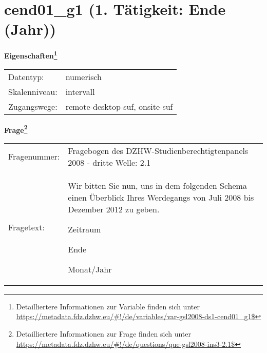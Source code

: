 
    \setcounter{footnote}{0}

    \vspace*{-1.8cm}
	\section{cend01\_g1 (1. Tätigkeit: Ende (Jahr))}
	\label{section:cend01_g1}



    \vspace*{0.5cm}
    \noindent\textbf{Eigenschaften\footnote{Detailliertere Informationen zur Variable finden sich unter
		\url{https://metadata.fdz.dzhw.eu/\#!/de/variables/var-gsl2008-ds1-cend01_g1$}}}\\
	\begin{tabularx}{\hsize}{@{}lX}
	Datentyp: & numerisch \\
	Skalenniveau: & intervall \\
	Zugangswege: &
	  remote-desktop-suf, 
	  onsite-suf
 \\
    \end{tabularx}



				\vspace*{0.5cm}
                \noindent\textbf{Frage\footnote{Detailliertere Informationen zur Frage finden sich unter
		              \url{https://metadata.fdz.dzhw.eu/\#!/de/questions/que-gsl2008-ins3-2.1$}}}\\
				\begin{tabularx}{\hsize}{@{}lX}
					Fragenummer: &
					  Fragebogen des DZHW-Studienberechtigtenpanels 2008 - dritte Welle:
					  2.1
 \\
					Fragetext: & Wir bitten Sie nun, uns in dem folgenden Schema einen Überblick Ihres Werdegangs von Juli 2008 bis Dezember 2012 zu geben.\par  Zeitraum\par  Ende\par  Monat/Jahr \\
				\end{tabularx}





